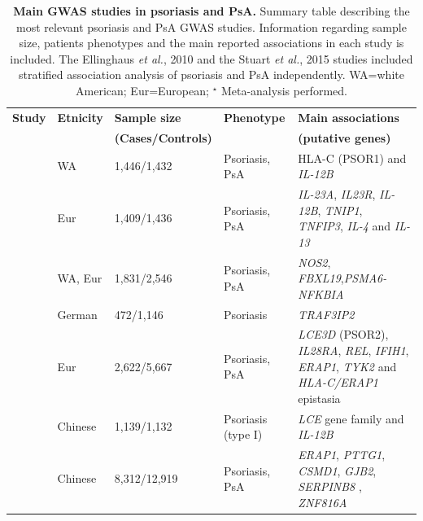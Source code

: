 %
\begin{landscape}
\begin{center}
\begin{longtable}[ht]{p{.25\textheight} p{.25\textheight} p{.20\textheight} p{.20\textheight} p{.50\textheight}}
\caption[Main GWAS studies in psoriasis and PsA]{\textbf{Main GWAS studies in psoriasis and PsA.} Summary table describing the most relevant psoriasis and PsA GWAS studies. Information regarding sample size, patients phenotypes and the main reported associations in each study is included. The Ellinghaus \textit{et al.}, 2010 and the Stuart \textit{et al.}, 2015 studies included stratified association analysis of psoriasis and PsA independently. WA=white American; Eur=European; $^\star$ Meta-analysis performed.}
\label{tab:GWAS_summary} \\
\toprule
\textbf{Study} & \textbf{Etnicity} & \textbf{Sample size}      & \textbf{Phenotype} & \textbf{Main associations} \\
               &                   & \textbf{(Cases/Controls)} &                    &  \textbf{(putative genes)}                  \\
\midrule
\midrule
\parencite{Cargill2007} &	WA &	1,446/1,432 &	Psoriasis, PsA &	HLA-C (PSOR1) and \textit{IL-12B} \\
\parencite{Nair2009} &	Eur	& 1,409/1,436 &	Psoriasis, PsA &	\textit{IL-23A}, \textit{IL23R}, \textit{IL-12B}, \textit{TNIP1}, \textit{TNFIP3}, \textit{IL-4} and \textit{IL-13} \\
\parencite{Stuart2010} &	WA, Eur &	1,831/2,546	& Psoriasis, PsA &	\textit{NOS2}, \textit{FBXL19},\textit{PSMA6-NFKBIA} \\

\parencite{Ellinghaus2010} &	German	& 472/1,146	& Psoriasis	& \textit{TRAF3IP2} \\

\parencite{Strange2010} &	Eur & 2,622/5,667 & Psoriasis, PsA & \textit{LCE3D} (PSOR2), \textit{IL28RA}, \textit{REL}, \textit{IFIH1}, \textit{ERAP1}, \textit{TYK2} and \textit{HLA-C/ERAP1} epistasia \\

\parencite{Zhang2008} & Chinese	& 1,139/1,132	& Psoriasis (type I)  & \textit{LCE} gene family and \textit{IL-12B} \\

\parencite{Sun2010} & Chinese	& 8,312/12,919	& Psoriasis, PsA &	\textit{ERAP1}, \textit{PTTG1}, \textit{CSMD1}, \textit{GJB2}, \textit{SERPINB8} , \textit{ZNF816A} \\


\end{longtable}
\end{center}
\end{landscape}
